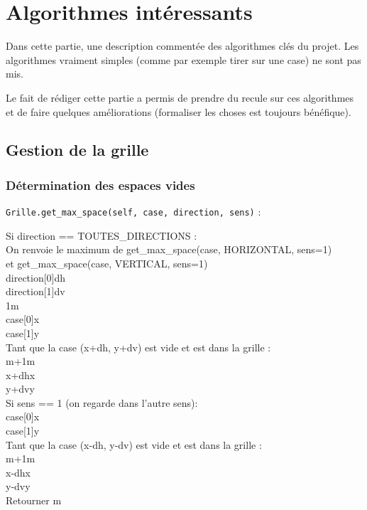 \chapter{Algorithmes intéressants}
Dans cette partie, une description commentée des algorithmes clés du projet. Les algorithmes vraiment simples (comme par exemple tirer sur une case) ne sont pas mis.

Le fait de rédiger cette partie a permis de prendre du recule sur ces algorithmes et de faire quelques améliorations (formaliser les choses est toujours bénéfique).
\section{Gestion de la grille}


\subsection{Détermination des espaces vides}\label{get_max_space}
\texttt{Grille.get\_max\_space(self, case, direction, sens)} :
\begin{algo1}
Si direction == TOUTES\_DIRECTIONS :\\
 On renvoie le maximum de get\_max\_space(case, HORIZONTAL, sens=1)\\
 et get\_max\_space(case, VERTICAL, sens=1)\\
direction[0]\sto dh\\
direction[1]\sto dv\\
1\sto m\\
case[0]\sto x\\
case[1]\sto y\\
Tant que la case (x+dh, y+dv) est vide et est dans la grille :\\
m+1\sto m\\
x+dh\sto x\\
y+dv\sto y\\
Si sens == 1 (on regarde dans l'autre sens):\\
case[0]\sto x\\
case[1]\sto y\\
Tant que la case (x-dh, y-dv) est vide et est dans la grille :\\
m+1\sto m\\
x-dh\sto x\\
y-dv\sto y\\
Retourner m\\
\end{algo1}

